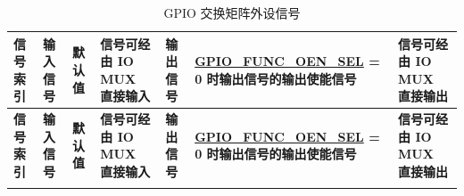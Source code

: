 \begin{longtable}{|L{1.5cm}|L{3.5cm}|C{1.2cm}|C{2.5cm}|L{3.2cm}|L{4.5cm}|L{2.5cm}| }
    \caption{GPIO 交换矩阵外设信号}
    \label{tab:iomuxgpio-periph-signals-via-gpio-matrix} \\
    \hline
\textbf{信号索引} & \textbf{输入信号} & \textbf{默认值} & \textbf{信号可经由 IO MUX 直接输入} & \textbf{输出信号} & \textbf{\hyperref[fielddesc:GPIOFUNCNOENSEL]{GPIO\_FUNC\_OEN\_SEL} = 0 时输出信号的输出使能信号} & \textbf{信号可经由 IO MUX 直接输出} \\
\hline
\endfirsthead
    \hline
\textbf{信号索引} & \textbf{输入信号} & \textbf{默认值} & \textbf{信号可经由 IO MUX 直接输入} & \textbf{输出信号} & \textbf{\hyperref[fielddesc:GPIOFUNCNOENSEL]{GPIO\_FUNC\_OEN\_SEL} = 0 时输出信号的输出使能信号} & \textbf{信号可经由 IO MUX 直接输出} \\
    \hline
    \endhead
    \endfoot


\end{longtable}
